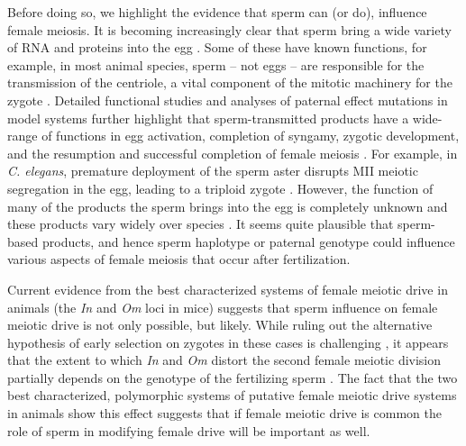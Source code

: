 \documentclass[12pt,letterpaper]{article}
\begin{document}
Before doing so, we highlight the evidence that sperm can (or do), influence female meiosis. 
It is becoming increasingly clear that sperm bring a wide variety of RNA and proteins into the egg \citep{Miller:05}. 
 Some of these have known functions, for example, in most
        animal species, sperm -- not eggs -- are
        responsible for the transmission of the centriole, a vital
        component of the mitotic machinery for the zygote \citep{Schatten:94}. 
Detailed functional studies and analyses of paternal effect mutations in model
systems further highlight that sperm-transmitted products have a wide-range of functions in
 egg activation, completion of syngamy, zygotic development, and the resumption
 and successful completion of
 female meiosis \cite[e.g.][]{Yasuda:95,Loppin:05,Miller:01, McNally:05,Churchill:03}. 
 For example, in \emph{C. elegans}, premature deployment of the sperm aster 
	disrupts MII meiotic segregation in the egg, leading to a triploid zygote \citep{McNally2012}.
However, the function of many of the products the sperm brings into the
        egg is completely unknown and 
      these products vary widely over species \citep{Karrbook:09}. 
It seems quite plausible that sperm-based products, and
	hence sperm haplotype or paternal genotype could influence 
	various aspects of female meiosis that occur after fertilization. 
\newline

Current evidence from the best characterized systems of female meiotic drive in animals 
	(the  \emph{In} and \emph{Om} loci in mice) 
	suggests that sperm influence on female meiotic drive is not only possible, but likely. 
 While ruling out the alternative hypothesis of early selection on zygotes in these cases is challenging  \citep[see pages 52-54 in][ for comment]{Burt2006}, it appears that the extent to which \emph{In} and \emph{Om} distort the second female meiotic division partially depends on the 	
	genotype of the fertilizing sperm \citep{Agulnik1993,Wu2005}. 
The fact that the two best characterized, polymorphic systems of putative female 
	meiotic drive systems in animals 
	show this effect suggests that if female meiotic drive is common 
	the role of sperm in modifying female drive will be important as well.  \newline
\end{document}
